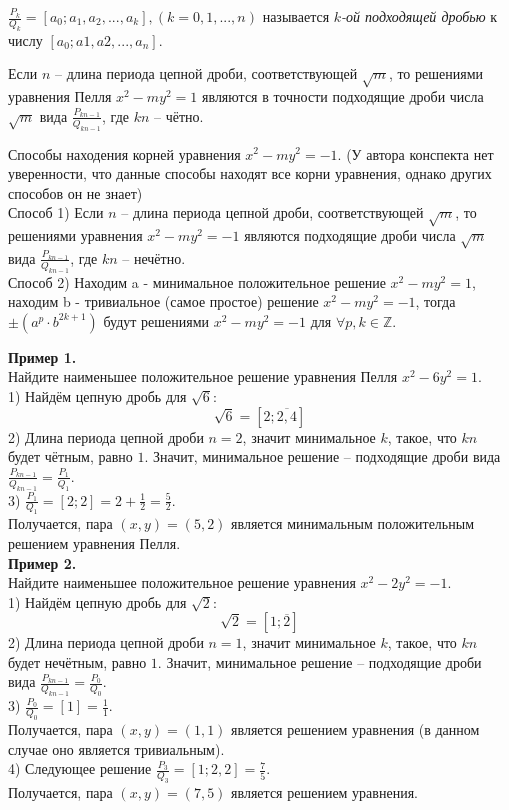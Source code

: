 \begin{definition}
    $\frac{P_k}{Q_k} = [a_0; a_1, a_2, ..., a_k], (k = 0, 1, ..., n)$ называется \textit{$k$-ой подходящей дробью} к числу $[a_0; a1, a2, ..., a_n]$.
\end{definition}

\begin{theorem}
    Если $n$ -- длина периода цепной дроби, соответствующей $\sqrt{m}$, то решениями уравнения Пелля $x^2 - my^2 = 1$ являются в точности подходящие дроби числа $\sqrt{m}$ вида $\frac{P_{kn-1}}{Q_{kn-1}}$, где $kn$ -- чётно.
\end{theorem}


\begin{note}
    Способы находения корней уравнения $x^2 - my^2 = -1$. (У автора конспекта нет уверенности, что данные способы находят все корни уравнения, однако других способов он не знает)\\
    Способ 1) Если $n$ -- длина периода цепной дроби, соответствующей $\sqrt{m}$, то решениями уравнения $x^2 - my^2 = -1$ являются подходящие дроби числа $\sqrt{m}$ вида $\frac{P_{kn-1}}{Q_{kn-1}}$, где $kn$ -- нечётно.\\
    Способ 2) Находим a - минимальное положительное решение $x^2-my^2 = 1$, находим b - тривиальное (самое простое) решение $x^2-my^2 = -1$, тогда $\pm(a^{p} \cdot b^{2k + 1})$ будут решениями $x^2-my^2 = -1$ для $\forall p, k \in \mathbb{Z}$. 
\end{note}

\textbf{Пример 1.}\\
Найдите наименьшее положительное решение уравнения Пелля $x^2 - 6y^2 = 1$.\\
1) Найдём цепную дробь для $\sqrt{6}$:
$$
    \sqrt{6} = [2; \overline{2, 4}]
$$
2) Длина периода цепной дроби $n = 2$, значит минимальное $k$, такое, что $kn$ будет чётным, равно $1$. Значит, минимальное решение -- подходящие дроби вида $\frac{P_{kn-1}}{Q_{kn-1}} = \frac{P_1}{Q_1}$.\\
3) $\frac{P_1}{Q_1} = [2; 2] = 2 + \frac{1}{2} = \frac{5}{2}$.\\
Получается, пара $(x, y) = (5, 2)$ является минимальным положительным решением уравнения Пелля.\\

\textbf{Пример 2.}\\
Найдите наименьшее положительное решение уравнения $x^2 - 2y^2 = -1$.\\
1) Найдём цепную дробь для $\sqrt{2}$:
$$
    \sqrt{2} = [1; \overline{2}]
$$
2) Длина периода цепной дроби $n = 1$, значит минимальное $k$, такое, что $kn$ будет нечётным, равно $1$. Значит, минимальное решение -- подходящие дроби вида $\frac{P_{kn-1}}{Q_{kn-1}} = \frac{P_0}{Q_0}$.\\
3) $\frac{P_0}{Q_0} = [1] = \frac{1}{1}$.\\
Получается, пара $(x, y) = (1, 1)$ является решением уравнения (в данном случае оно является тривиальным).\\
4) Следующее решение $\frac{P_3}{Q_3} = [1; 2, 2] = \frac{7}{5}$.\\
Получается, пара $(x, y) = (7, 5)$ является решением уравнения.\\


